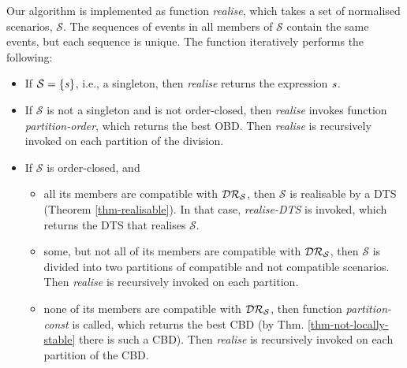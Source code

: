 Our algorithm is implemented as function \emph{realise}, which takes
a set of normalised scenarios, $\mathcal{S}$. The sequences of events in
all members of $\mathcal{S}$ contain the same events, but each
sequence is unique. The function iteratively
performs the following:
\begin{itemize}[noitemsep]
\item
  If $\mathcal{S}=\{\mathit{s}\}$, i.e., a singleton, then \emph{realise} returns the
  expression $\mathit{s}$.
  \item
    If $\mathcal{S}$ is not a singleton and is not order-closed, then \emph{realise} invokes
    function \emph{partition-order},
       which returns the best OBD.
Then \emph{realise} is recursively invoked on each partition of the
    division.
\item
  If $\mathcal{S}$ is order-closed, and
  \begin{itemize}
    \item
  all its members are compatible with $\mathcal{DR}_{\mathcal{S}}$,
  then $\mathcal{S}$ is realisable by a DTS (Theorem \ref{thm-realisable}). In that
  case, \emph{realise-DTS} \cite{DTS-2025} is invoked, which returns
  the DTS that realises $\mathcal{S}$.
\item
  some, but not all of its members are
  compatible with $\mathcal{DR}_{\mathcal{S}}$, then $\mathcal{S}$ is divided into two partitions of
  compatible and not compatible scenarios.
Then \emph{realise} is recursively invoked on each partition.
\item
  none of its members are compatible with $\mathcal{DR}_{\mathcal{S}}$,
  then function \emph{partition-const} is called,
  which returns the best CBD
 (by Thm. \ref{thm-not-locally-stable} there is such a CBD).
  Then \emph{realise} is recursively invoked on each partition of the CBD.
  \end{itemize}
   \end{itemize}
